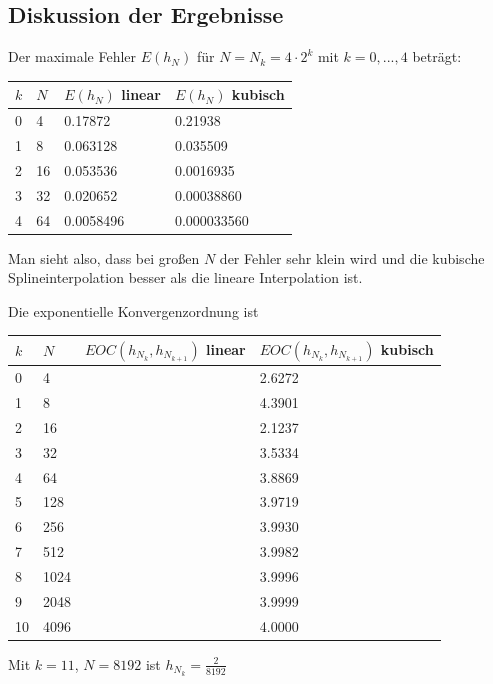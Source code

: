 \documentclass[ngerman,a4paper]{texmf/tex/latex/mathscript/mathscript}
\begin{document}
	\subsection{Diskussion der Ergebnisse}
	
	Der maximale Fehler $E(h_N)$ für $N=N_k=4\cdot 2^k$ mit $k=0,...,4$ beträgt:
	\begin{center}
		\begin{tabular}{ll|l|l}
			$k$ & $N$ & $E(h_N)$ linear & $E(h_N)$ kubisch \\
			\hline
			0 & 4 & 0.17872 & 0.21938 \\
			\hline
			1 & 8 & 0.063128 & 0.035509 \\
			\hline 
			2 & 16 & 0.053536  & 0.0016935\\
			\hline 
			3 & 32 & 0.020652  & 0.00038860\\
			\hline 
			4 & 64 & 0.0058496 & 0.000033560\\
		\end{tabular}
	\end{center} 

Man sieht also, dass bei großen $N$ der Fehler sehr klein wird und die kubische Splineinterpolation besser als die lineare Interpolation ist.

Die exponentielle Konvergenzordnung ist
\begin{center}
	\begin{tabular}{ll|l|l}
		$k$ & $N$ & $EOC(h_{N_k},h_{N_{k+1}})$ linear & $EOC(h_{N_k},h_{N_{k+1}})$ kubisch \\
		\hline
		0 & 4 & & 2.6272\\
		\hline
		1 & 8 & & 4.3901\\
		\hline
		2 & 16 & & 2.1237\\
		\hline
		3 & 32 & & 3.5334\\
		\hline
		4 & 64 & & 3.8869\\
		\hline
		5 & 128 & & 3.9719\\
		\hline
		6 & 256 & & 3.9930\\
		\hline
		7 & 512 & & 3.9982\\
		\hline
		8 & 1024 & & 3.9996\\
		\hline
		9 & 2048 & & 3.9999\\
		\hline
		10 & 4096 & & 4.0000\\
		\hline
	\end{tabular}
\end{center}

Mit $k=11$, $N=8192$ ist $h_{N_k}= \frac{2}{8192}$
\end{document}
